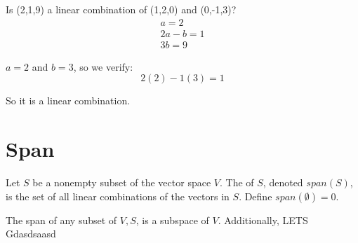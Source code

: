 \documentclass{article}
\begin{document}
\begin{example}[Vectors]
\end{example}

Is (2,1,9) a linear combination of (1,2,0) and (0,-1,3)?
\begin{align*}
    a = 2\\
    2a - b = 1\\
    3b = 9
\end{align*}

$a = 2$ and $b = 3$, so we verify:
\[
2(2) - 1(3) = 1
\]

So it is a linear combination.

\section{Span}
\begin{definition}
    Let $S$ be a nonempty subset of the vector space $V$. The  of $S$, denoted $span(S)$, is the set of all linear combinations of the vectors in $S$. Define $span(\emptyset) = 0$.
\end{definition}

\begin{theorem}
    The span of any subset of $V, S$, is a subspace of $V$. Additionally, 
    LETS Gdasdsaasd
\end{theorem}
\end{document}

